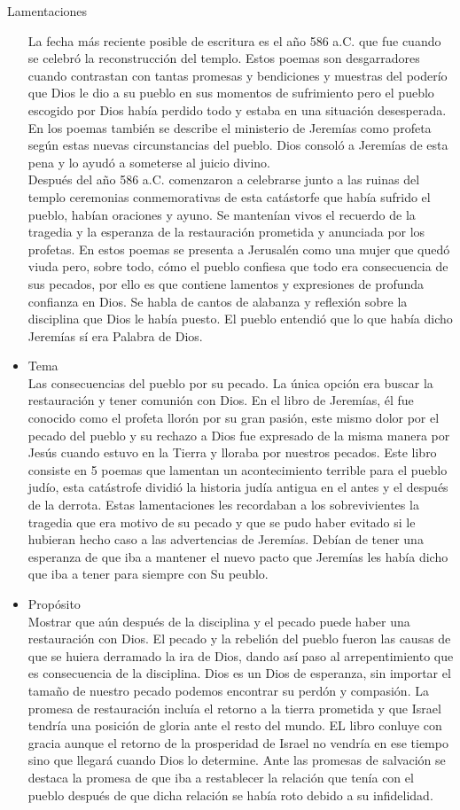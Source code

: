\begin{section}{Lamentaciones}
\begin{itemize}
			La fecha más reciente posible de escritura es el año 586 a.C. que fue cuando se celebró la reconstrucción del templo. Estos poemas son desgarradores cuando contrastan con tantas promesas y bendiciones y muestras del poderío que Dios le dio a su pueblo en sus momentos de sufrimiento pero el pueblo escogido por Dios había perdido todo y estaba en una situación desesperada. En los poemas también se describe el ministerio de Jeremías como profeta según estas nuevas circunstancias del pueblo. Dios consoló a Jeremías de esta pena y lo ayudó a someterse al juicio divino.\\
			Después del año 586 a.C. comenzaron a celebrarse junto a las ruinas del templo ceremonias conmemorativas de esta catástorfe que había sufrido el pueblo, habían oraciones y ayuno. Se mantenían vivos el recuerdo de la tragedia y la esperanza de la restauración prometida y anunciada por los profetas.
			\newpage
			En estos poemas se presenta a Jerusalén como una mujer que quedó viuda pero, sobre todo, cómo el pueblo confiesa que todo era consecuencia de sus pecados, por ello es que contiene lamentos y expresiones de profunda confianza en Dios. Se habla de cantos de alabanza y reflexión sobre la disciplina que Dios le había puesto. El pueblo entendió que lo que había dicho Jeremías sí era Palabra de Dios.
		\item Tema\\
			Las consecuencias del pueblo por su pecado. La única opción era buscar la restauración y tener comunión con Dios. En el libro de Jeremías, él fue conocido como el profeta llorón por su gran pasión, este mismo dolor por el pecado del pueblo y su rechazo a Dios fue expresado de la misma manera por Jesús cuando estuvo en la Tierra y lloraba por nuestros pecados. Este libro consiste en 5 poemas que lamentan un acontecimiento terrible para el pueblo judío, esta catástrofe dividió la historia judía antigua en el antes y el después de la derrota. Estas lamentaciones les recordaban a los sobrevivientes la tragedia que era motivo de su pecado y que se pudo haber evitado si le hubieran hecho caso a las advertencias de Jeremías. Debían de tener una esperanza de que iba a mantener el nuevo pacto que Jeremías les había dicho que iba a tener para siempre con Su peublo.	
		\item Propósito\\
			Mostrar que aún después de la disciplina y el pecado puede haber una restauración con Dios. El pecado y la rebelión del pueblo fueron las causas de que se huiera derramado la ira de Dios, dando así paso al arrepentimiento que es consecuencia de la disciplina. Dios es un Dios de esperanza, sin importar el tamaño de nuestro pecado podemos encontrar su perdón y compasión. La promesa de restauración incluía el retorno a la tierra prometida y que Israel tendría una posición de gloria ante el resto del mundo. EL libro conluye con gracia aunque el retorno de la prosperidad de Israel no vendría en ese tiempo sino que llegará cuando Dios lo determine. Ante las promesas de salvación se destaca la promesa de que iba a restablecer la relación que tenía con el pueblo después de que dicha relación se había roto debido a su infidelidad.

\end{itemize}
\end{section}
